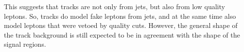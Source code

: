 This suggests that tracks are not only from jets, but also from low quality leptons. So, tracks do model fake leptons from jets, and at the same time also model leptons that were vetoed by quality cuts. However, the general shape of the track background is still expected to be in agreement with the shape of the signal regions. 
